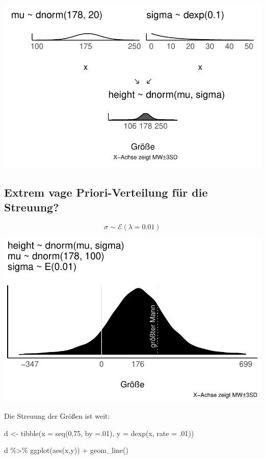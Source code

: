 \documentclass[
  a4paper,
  DIV=11]{scrreprt}
\newenvironment{Shaded}{\begin{snugshade}}{\end{snugshade}}
\newcommand{\AttributeTok}[1]{\textcolor[rgb]{0.40,0.45,0.13}{#1}}
\newcommand{\DecValTok}[1]{\textcolor[rgb]{0.68,0.00,0.00}{#1}}
\newcommand{\FunctionTok}[1]{\textcolor[rgb]{0.28,0.35,0.67}{#1}}
\newcommand{\NormalTok}[1]{\textcolor[rgb]{0.00,0.23,0.31}{#1}}
\newcommand{\OtherTok}[1]{\textcolor[rgb]{0.00,0.23,0.31}{#1}}
\newcommand{\SpecialCharTok}[1]{\textcolor[rgb]{0.37,0.37,0.37}{#1}}
\theoremstyle{definition}
\theoremstyle{remark}
\begin{document}
\includegraphics{./gauss_files/figure-pdf/Kung-15-1.pdf}

\hypertarget{extrem-vage-priori-verteilung-fuxfcr-die-streuung}{%
\subsection{Extrem vage Priori-Verteilung für die
Streuung?}\label{extrem-vage-priori-verteilung-fuxfcr-die-streuung}}

\[\sigma \sim \mathcal{E}(\lambda=0.01)\]

\includegraphics{./gauss_files/figure-pdf/Kung-16-1.pdf}

Die Streuung der Größen ist weit:

\begin{Shaded}
\begin{Highlighting}[]
\NormalTok{d }\OtherTok{\textless{}{-}} 
  \FunctionTok{tibble}\NormalTok{(}\AttributeTok{x =} \FunctionTok{seq}\NormalTok{(}\DecValTok{0}\NormalTok{,}\DecValTok{75}\NormalTok{, }\AttributeTok{by =}\NormalTok{.}\DecValTok{01}\NormalTok{),}
         \AttributeTok{y =} \FunctionTok{dexp}\NormalTok{(x, }\AttributeTok{rate =}\NormalTok{ .}\DecValTok{01}\NormalTok{))}

\NormalTok{d }\SpecialCharTok{\%\textgreater{}\%} 
  \FunctionTok{ggplot}\NormalTok{(}\FunctionTok{aes}\NormalTok{(x,y)) }\SpecialCharTok{+}
  \FunctionTok{geom\_line}\NormalTok{()}
\end{Highlighting}
\end{Shaded}
\end{document}
